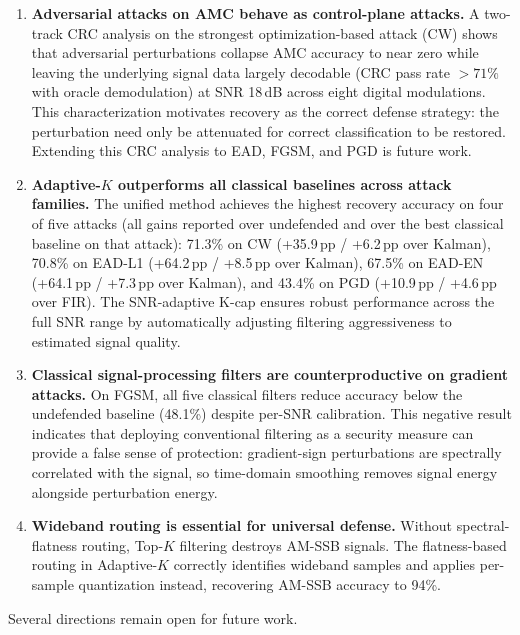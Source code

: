 \begin{enumerate}
\item \textbf{Adversarial attacks on AMC behave as control-plane attacks.}
  A two-track CRC analysis on the strongest optimization-based attack
  (CW) shows that adversarial perturbations collapse AMC accuracy to
  near zero while leaving the underlying signal data largely decodable
  (CRC pass rate $> 71\%$ with oracle demodulation) at SNR 18\,dB
  across eight digital modulations. This characterization motivates
  recovery as the correct defense strategy: the perturbation need only be
  attenuated for correct classification to be restored. Extending this
  CRC analysis to EAD, FGSM, and PGD is future work.

\item \textbf{Adaptive-$K$ outperforms all classical baselines across
  attack families.} The unified method achieves the highest recovery
  accuracy on four of five attacks (all gains reported over undefended
  and over the best classical baseline on that attack): 71.3\% on CW
  (+35.9\,pp / +6.2\,pp over Kalman), 70.8\% on EAD-L1
  (+64.2\,pp / +8.5\,pp over Kalman), 67.5\% on EAD-EN
  (+64.1\,pp / +7.3\,pp over Kalman), and 43.4\% on PGD
  (+10.9\,pp / +4.6\,pp over FIR). The SNR-adaptive K-cap ensures
  robust performance across the full SNR range by automatically adjusting
  filtering aggressiveness to estimated signal quality.

\item \textbf{Classical signal-processing filters are counterproductive
  on gradient attacks.} On FGSM, all five classical filters reduce
  accuracy below the undefended baseline (48.1\%) despite per-SNR
  calibration. This negative result indicates that deploying conventional
  filtering as a security measure can provide a false sense of protection:
  gradient-sign perturbations are spectrally correlated with the signal,
  so time-domain smoothing removes signal energy alongside perturbation
  energy.

\item \textbf{Wideband routing is essential for universal defense.}
  Without spectral-flatness routing, Top-$K$ filtering destroys AM-SSB
  signals. The flatness-based routing in Adaptive-$K$ correctly
  identifies wideband samples and applies per-sample quantization instead,
  recovering AM-SSB accuracy to 94\%.
\end{enumerate}

Several directions remain open for future work.

